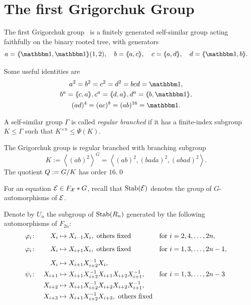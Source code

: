 \documentclass[a4paper,11pt]{amsart}
\begin{document}
\section{The first Grigorchuk Group}\label{sec:GrigorchukGroup}
The first Grigorchuk group~\cite{Grigorchuk:Burnside} is a finitely
generated self-similar group acting faithfully on the binary rooted
tree, with generators
\[a=\pair{\id,\id}(1,2),\quad b=\pair{a,c},\quad c=\pair{a,d},\quad d=\pair{\id,b}. \]

Some useful identities are
\begin{gather*}
  a^2=b^2=c^2=d^2=bcd=\id,\\
  b^a= \pair{c,a}, c^a=\pair{d,a}, d^a=\pair{b,\id},\\
  (ad)^4=(ac)^8=(ab)^{16}= \id.
\end{gather*}
\begin{defi}
 A self-similar group $\Gamma$ is called \emph{regular branched} if it
 has a finite-index subgroup $K\leq \Gamma$ such that $K^{\times n} \leq \Psi(K)$.
\end{defi}
\begin{lem}\label{lem:subgroupK}
The Grigorchuk group is regular branched with branching subgroup 
 \[K:= \left<(ab)^2\right>^G=\left< (ab)^2,(bada)^2,(abad)^2 \right>. \]
 The quotient $Q := {G/K}$ has order $16$.\qed
\end{lem}

For an equation $\mathcal{E}\in F_{\mathcal X}*G$, recall that
$\operatorname{Stab}(\mathcal{E})$ denotes the group of $G$-automorphisms of $\mathcal{E}$.

Denote by $U_n$ the subgroup of $\operatorname{Stab}(R_n)$ generated by the
following automorphisms of $F_{2n}$:
 \begin{align*}
   \varphi_i&\colon& X_i&\mapsto X_{i-1}X_i, \textup{ others fixed} & \textup{for }&i=2,4,\dotsc,2n,\\[1ex]
   \varphi_i&\colon&X_i&\mapsto X_{i+1}X_i, \textup{ others fixed} & \textup{for }&i=1,3,\dotsc,2n-1,\\[1ex]
   && X_i&\mapsto X_{i+1}X_{i+2}^{-1}X_i,\\
   \psi_i&\colon & X_{i+1}&\mapsto X_{i+1}X_{i+2}^{-1}X_{i+1}X_{i+2}X_{i+1}^{-1}, & \textup{for }&i=1,3,\dotsc,2n-3\\
   && X_{i+2}&\mapsto X_{i+1}X_{i+2}^{-1}X_{i+2}X_{i+2}X_{i+1}^{-1},\\
   && X_{i+3}&\mapsto X_{i+1}X_{i+2}^{-1}X_{i+3}, \textup{ others fixed}
\end{align*}
\end{document}
